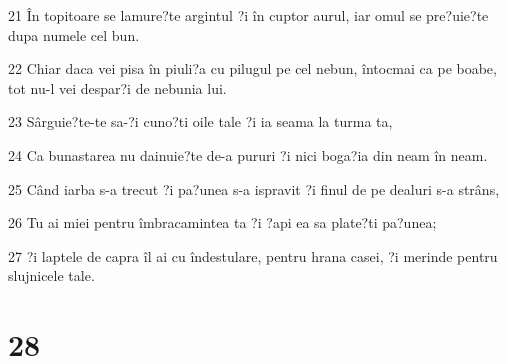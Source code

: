 \par 21 În topitoare se lamure?te argintul ?i în cuptor aurul, iar omul se pre?uie?te dupa numele cel bun.
\par 22 Chiar daca vei pisa în piuli?a cu pilugul pe cel nebun, întocmai ca pe boabe, tot nu-l vei despar?i de nebunia lui.
\par 23 Sârguie?te-te sa-?i cuno?ti oile tale ?i ia seama la turma ta,
\par 24 Ca bunastarea nu dainuie?te de-a pururi ?i nici boga?ia din neam în neam.
\par 25 Când iarba s-a trecut ?i pa?unea s-a ispravit ?i finul de pe dealuri s-a strâns,
\par 26 Tu ai miei pentru îmbracamintea ta ?i ?api ea sa plate?ti pa?unea;
\par 27 ?i laptele de capra îl ai cu îndestulare, pentru hrana casei, ?i merinde pentru slujnicele tale.

\chapter{28}

